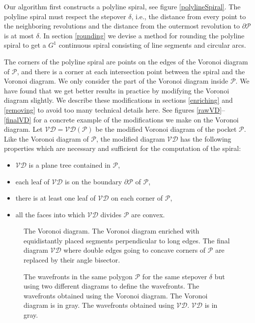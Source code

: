 \documentclass[3p]{elsarticle}
\newcommand{\VD}{\mathcal{VD}}
\newcommand{\PP}{\mathcal{P}}
\newcommand{\stepover}{\delta}
\begin{document}
Our algorithm first constructs a polyline spiral, see figure \ref{polylineSpiral}.
The polyline spiral must respect the stepover $\delta$, i.e.,
the distance from every point to the neighboring revolutions
and the distance from the outermost revolution to $\partial\PP$
is at most $\delta$.
In section \ref{rounding}
we devise a method for rounding the polyline spiral to get a $G^1$ continuous spiral
consisting of line segments
and circular arcs. 

The corners of the
polyline spiral are points on the edges of the Voronoi diagram of $\PP$, and there
is a corner at each intersection point between the spiral and the Voronoi diagram.
We only consider the part of the Voronoi diagram inside $\PP$. We have found
that we get better results in practice by modifying the Voronoi diagram slightly.
We describe these modifications in sections \ref{enriching} and \ref{removing}
to avoid too many technical details here.
See figures \ref{rawVD}--\ref{finalVD} for a concrete example of the modifications
we make on the Voronoi diagram.
Let $\VD=\VD(\PP)$ be the modified Voronoi diagram of the pocket $\PP$. 
Like the Voronoi diagram of $\PP$, the modified diagram
$\VD$ has the following properties which are necessary and sufficient for
the computation of the spiral:
\begin{itemize}
\setlength\itemsep{0em}
\item $\VD$ is a plane tree contained in $\PP$,
\item each leaf of $\VD$ is on the boundary $\partial\PP$ of $\PP$,
\item there is at least one leaf of $\VD$ on each corner of $\PP$,
\item all the faces into which $\VD$ divides $\PP$ are convex.
\end{itemize}

\begin{figure*}
\centering
{}\quad
{}
\caption{ The Voronoi diagram.
 The Voronoi diagram enriched with equidistantly placed
segments perpendicular to long edges.
 The final diagram $\VD$ where double edges going to concave corners
of $\PP$ are replaced by their angle bisector.
}
\end{figure*}

\begin{figure*}
\centering
{}\quad
{}
\caption{The wavefronts in the same polygon $\PP$ for the same stepover $\stepover$
but using two different diagrams to define the wavefronts.
 The wavefronts obtained using the Voronoi diagram. The Voronoi
diagram is in gray.
 The wavefronts obtained using $\VD$. $\VD$ is in gray.
}
\label{wavefronts}
\end{figure*}
\end{document}
